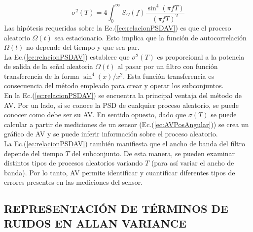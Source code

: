 \documentclass[a4paper,11pt,twoside]{IT-CNEA}
\begin{document}
\begin{equation}
\sigma^2(T)=4\int_0^{\infty}S_{\Omega}(f)\frac{\sin^4(\pi fT)}{\left( \pi fT\right)^2}
\label{ec:relacionPSDAV}
\end{equation}
Las hipótesis requeridas sobre la Ec.(\ref{ec:relacionPSDAV}) es que el proceso aleatorio $\Omega(t)$ sea estacionario. Esto implica que la función de autocorrelación $\Omega(t)$ no depende del tiempo y que sea par.
\\ La Ec.(\ref{ec:relacionPSDAV}) establece que $\sigma^2(T)$ es proporcional a la potencia de salida de la señal aleatoria $\Omega(t)$ al pasar por un filtro con función transferencia de la forma $\sin^4(x)/x^2$. Esta función transferencia es consecuencia del método empleado para crear y operar los subconjuntos. 
\\ En la Ec.(\ref{ec:relacionPSDAV}) se encuentra la principal ventaja del método de AV. Por un lado, si se conoce la PSD de cualquier proceso aleatorio, se puede conocer como debe ser su AV. En sentido opuesto, dado que $\sigma(T)$ se puede calcular a partir de mediciones de un sensor (Ec.(\ref{ec:AVPosAngular})) se crea un gráfico de AV y se puede inferir información sobre el proceso aleatorio.
\\ La Ec.(\ref{ec:relacionPSDAV}) también manifiesta que el ancho de banda del filtro depende del tiempo $T$ del subconjunto. De esta manera, se pueden examinar distintos tipos de procesos aleatorios variando $T$ (para así variar el ancho de banda). Por lo tanto, AV permite identificar y cuantificar diferentes tipos de errores presentes en las mediciones del sensor. 
\subsection{REPRESENTACIÓN DE TÉRMINOS DE RUIDOS EN ALLAN VARIANCE}
\end{document}
